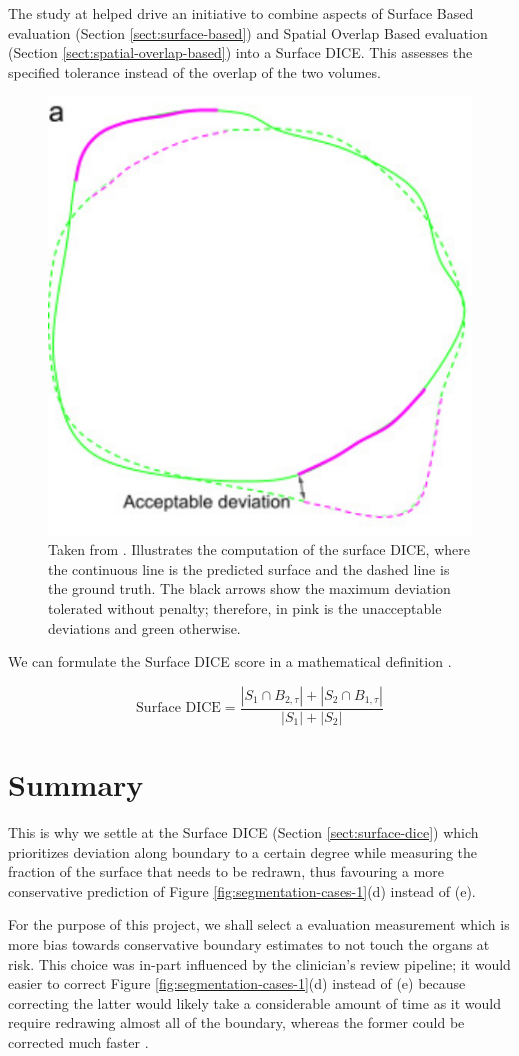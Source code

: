 \documentclass[11pt,twoside]{report}
\begin{document}
The study at \cite{Sherer2021-le} helped drive an initiative to combine aspects of Surface Based evaluation (Section \ref{sect:surface-based}) and Spatial Overlap Based evaluation (Section \ref{sect:spatial-overlap-based}) into a Surface DICE. This assesses the specified tolerance instead of the overlap of the two volumes. 

\begin{figure}[H]
  \centering
  \includegraphics[width=0.3\linewidth]{../figures/Surface-dice.png}
  \caption{Taken from \cite{Nikolov2021-xe}. Illustrates the computation of the surface DICE, where the continuous line is the predicted surface and the dashed line is the ground truth. The black arrows show the maximum deviation tolerated without penalty; therefore, in pink is the unacceptable deviations and green otherwise.}
\end{figure}

We can formulate the Surface DICE score in a mathematical definition \cite{Sherer2021-le}.

\begin{equation*}
  \text{Surface DICE} = \frac{|S_1 \cap B_{2,\tau}| + |S_2 \cap B_{1,\tau}|}{|S_1| + |S_2|}
\end{equation*}


\section{Summary}

This is why we settle at the Surface DICE (Section \ref{sect:surface-dice}) which prioritizes deviation along boundary to a certain degree while measuring the fraction of the surface that needs to be redrawn, thus favouring a more conservative prediction of Figure \ref{fig:segmentation-cases-1}(d) instead of (e).

For the purpose of this project, we shall select a evaluation measurement which is more bias towards conservative boundary estimates to not touch the organs at risk. This choice was in-part influenced by the clinician's review pipeline; it would easier to correct Figure \ref{fig:segmentation-cases-1}(d) instead of (e) because correcting the latter would likely take a considerable amount of time as it would require redrawing almost all of the boundary, whereas the former could be corrected much faster \cite{Nikolov2021-xe}.
\end{document}

